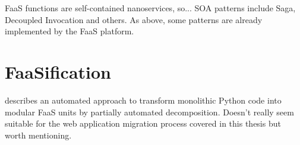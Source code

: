 FaaS functions are self-contained nanoservices, so...
SOA patterns \parencite{rotem12soa} include Saga, Decoupled Invocation and others.
As above, some patterns are already implemented by the FaaS platform.

\section{FaaSification} \label{sec:faasification}

\textcite{spillner17transformpython} describes an automated approach to transform monolithic Python code into modular FaaS units by partially automated decomposition. Doesn't really seem suitable for the web application migration process covered in this thesis but worth mentioning.
